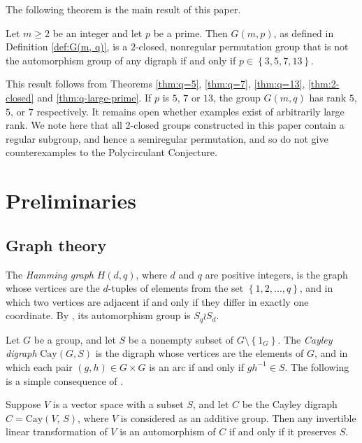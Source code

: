 \documentclass[ALCO, Unicode]{cedram}
\newcommand{\Cay}{\mathrm{Cay}}
\begin{document}
The following theorem is the main result of this paper.

\begin{theorem}
Let $m \geqslant 2$ be an integer and let $p$ be a prime. Then $G{\left(m, p \right)}$, as defined in Definition \ref{def:G(m, q)}, is a $2$-closed, nonregular permutation group that is not the automorphism group of any digraph if and only if $p \in \left\{3, 5, 7, 13 \right\}$.
\end{theorem}

This result follows from Theorems \ref{thm:q=5}, \ref{thm:q=7}, \ref{thm:q=13}, \ref{thm:2-closed} and \ref{thm:q-large-prime}. If $p$ is $5$, $7$ or $13$, the group $G{\left(m, q \right)}$ has rank $5$, $5$, or $7$ respectively. It remains open whether examples exist of arbitrarily large rank. We note here that all 2-closed groups constructed in this paper contain a regular subgroup, and hence a semiregular permutation, and so do not give counterexamples to the Polycirculant Conjecture.

\section{Preliminaries}

\subsection{Graph theory}

The \emph{Hamming graph} $H{\left(d, q \right)}$, where $d$ and $q$ are positive integers, is the graph whose vertices are the $d$-tuples of elements from the set $\left\{1, 2, \ldots, q \right\}$, and in which two vertices are adjacent if and only if they differ in exactly one coordinate. By \cite[Theorem 9.2.1]{ref:brouwer-distance}, its automorphism group is $S_q \wr S_d$.

Let $G$ be a group, and let $S$ be a nonempty subset of $G \setminus \left\{1_G \right\}$. The \emph{Cayley digraph} $\Cay{\left(G, S \right)}$ is the digraph whose vertices are the elements of $G$, and in which each pair $\left(g, h \right) \in G \times G$ is an arc if and only if $g h^{-1} \in S$. The following is a simple consequence of \cite[Lemma 3.7.3]{ref:godsil-algebraic}.

\begin{lemma} \label{lm:endomorphism-automorphism}
Suppose $V$ is a vector space with a subset $S$, and let $C$ be the Cayley digraph $C = \Cay{\left(V,\, S \right)}$, where $V$ is considered as an additive group. Then any invertible linear transformation of $V$ is an automorphism of $C$ if and only if it preserves $S$.
\end{lemma}
\end{document}
